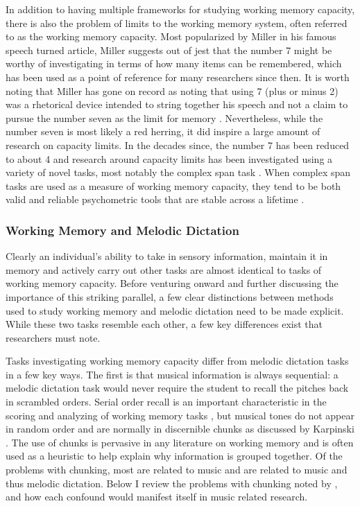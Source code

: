 \documentclass[12pt,]{book}
\begin{document}
In addition to having multiple frameworks for studying working memory capacity, there is also the problem of limits to the working memory system, often referred to as the working memory capacity.
Most popularized by Miller in his famous \citep{millerMagicalNumberSeven1956} speech turned article, Miller suggests out of jest that the number 7 might be worthy of investigating in terms of how many items can be remembered, which has been used as a point of reference for many researchers since then.
It is worth noting that Miller has gone on record as noting that using 7 (plus or minus 2) was a rhetorical device intended to string together his speech and not a claim to pursue the number seven as the limit for memory \citep{millerHistoryPsychologyAutobiography1989}.
Nevertheless, while the number seven is most likely a red herring, it did inspire a large amount of research on capacity limits.
In the decades since, the number 7 has been reduced to about 4 \citep{cowanMagicalMysteryFour2010} and research around capacity limits has been investigated using a variety of novel tasks, most notably the complex span task \citep{unsworthAutomatedVersionOperation2005, unsworthComplexWorkingMemory2009}.
When complex span tasks are used as a measure of working memory capacity, they tend to be both valid and reliable psychometric tools that are stable across a lifetime \citep{unsworthAutomatedVersionOperation2005}.

\hypertarget{working-memory-and-melodic-dictation}{%
\subsubsection{Working Memory and Melodic Dictation}\label{working-memory-and-melodic-dictation}}

Clearly an individual's ability to take in sensory information, maintain it in memory and actively carry out other tasks are almost identical to tasks of working memory capacity.
Before venturing onward and further discussing the importance of this striking parallel, a few clear distinctions between methods used to study working memory and melodic dictation need to be made explicit.
While these two tasks resemble each other, a few key differences exist that researchers must note.

Tasks investigating working memory capacity differ from melodic dictation tasks in a few key ways.
The first is that musical information is always sequential: a melodic dictation task would never require the student to recall the pitches back in scrambled orders.
Serial order recall is an important characteristic in the scoring and analyzing of working memory tasks \citep{conwayWorkingMemorySpan2005}, but musical tones do not appear in random order and are normally in discernible chunks as discussed by Karpinski \citep{karpinskiAuralSkillsAcquisition2000}.
The use of chunks is pervasive in any literature on working memory and is often used as a heuristic to help explain why information is grouped together.
Of the problems with chunking, most are related to music and are related to music and thus melodic dictation.
Below I review the problems with chunking noted by \citet{cowanWorkingMemoryCapacity2005}, and how each confound would manifest itself in music related research.
\end{document}
